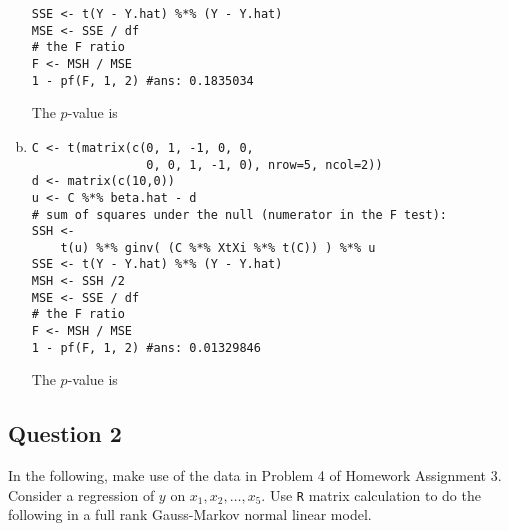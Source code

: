 \documentclass[paper=a4, fontsize=11pt]{scrartcl} %
\begin{document}
\begin{enumerate}[(a)]
\begin{lstlisting}[basicstyle=\ttfamily\small\bfseries]
SSE <- t(Y - Y.hat) %*% (Y - Y.hat)
MSE <- SSE / df
# the F ratio
F <- MSH / MSE
1 - pf(F, 1, 2) #ans: 0.1835034
\end{lstlisting}

The $p$-value is \ \\


\item   
 
 \begin{lstlisting}[basicstyle=\ttfamily\small\bfseries]
C <- t(matrix(c(0, 1, -1, 0, 0,
                0, 0, 1, -1, 0), nrow=5, ncol=2))
d <- matrix(c(10,0))
u <- C %*% beta.hat - d
# sum of squares under the null (numerator in the F test):
SSH <-
    t(u) %*% ginv( (C %*% XtXi %*% t(C)) ) %*% u
SSE <- t(Y - Y.hat) %*% (Y - Y.hat)
MSH <- SSH /2 
MSE <- SSE / df
# the F ratio
F <- MSH / MSE
1 - pf(F, 1, 2) #ans: 0.01329846
\end{lstlisting}

The $p$-value is \ \\
\end{enumerate}

\bigskip
\bigskip
\subsection*{Question 2}
In the following, make use of the data in Problem 4 of Homework Assignment 3. 
Consider a regression of $y$ on $x_1, x_2, \ldots, x_5$. Use \texttt{R} matrix 
calculation to do the following in a full rank Gauss-Markov normal linear model.\\
\end{document}
